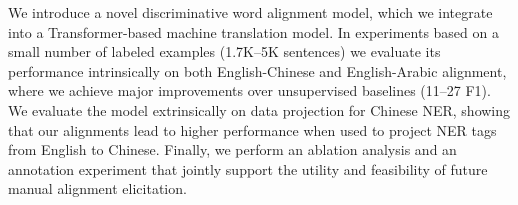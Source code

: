 We introduce a novel discriminative word alignment model, which we integrate into a Transformer-based machine translation model. In experiments based on a small number of labeled examples (\∼1.7K–5K sentences) we evaluate its performance intrinsically on both English-Chinese and English-Arabic alignment, where we achieve major improvements over unsupervised baselines (11–27 F1). We evaluate the model extrinsically on data projection for Chinese NER, showing that our alignments lead to higher performance when used to project NER tags from English to Chinese. Finally, we perform an ablation analysis and an annotation experiment that jointly support the utility and feasibility of future manual alignment elicitation.